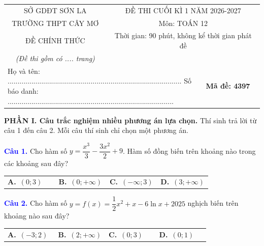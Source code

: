 \documentclass[12pt,a4paper]{article}
\begin{document}
\begin{center}
\begin{tabular}{|p{0.4\linewidth}|p{0.35\linewidth}|p{0.25\linewidth}|}
\hline
\multicolumn{1}{|c|}{SỞ GDĐT SƠN LA} & \multicolumn{2}{c|}{ĐỀ THI CUỐI KÌ 1 NĂM 2026-2027} \\
\multicolumn{1}{|c|}{TRƯỜNG THPT CÂY MƠ} & \multicolumn{2}{c|}{Môn: TOÁN 12} \\
\multicolumn{1}{|c|}{ĐỀ CHÍNH THỨC} & \multicolumn{2}{c|}{Thời gian: 90 phút, không kể thời gian phát đề} \\
\multicolumn{1}{|c|}{\textit{(Đề thi gồm có .... trang)}} & \multicolumn{2}{c|}{} \\
\hline
\multicolumn{2}{|p{0.75\linewidth}|}{Họ và tên: ........................................................................................ \newline Số báo danh: ....................................................................................} & \multicolumn{1}{c|}{\textbf{Mã đề: 4397}} \\
\hline
\end{tabular}
\end{center}

\bigskip

\noindent\textbf{PHẦN I. Câu trắc nghiệm nhiều phương án lựa chọn.}
Thí sinh trả lời từ câu 1 đến câu 2. Mỗi câu thí sinh chỉ chọn một phương án.

\medskip

\noindent\textcolor{blue}{\textbf{Câu 1.}} Cho hàm số $y=\dfrac{x^{3}}{3} - \dfrac{3 x^{2}}{2} + 9$. Hàm số đồng biến trên khoảng nào trong các khoảng sau đây?

\noindent\begin{tabular}{p{0.25\linewidth} p{0.25\linewidth} p{0.25\linewidth} p{0.25\linewidth}}
\textbf{A.}~$(0;3)$ & \textbf{B.}~$(0;+\infty)$ & \textbf{C.}~$(-\infty;3)$ & \textbf{D.}~$(3;+\infty)$ \\
\end{tabular}

\noindent\textcolor{blue}{\textbf{Câu 2.}} Cho hàm số $y=f(x)=\dfrac{1}{2} x^2+x-6\ln x+2025$ nghịch biến trên khoảng nào sau đây?

\noindent\begin{tabular}{p{0.25\linewidth} p{0.25\linewidth} p{0.25\linewidth} p{0.25\linewidth}}
\textbf{A.}~$(-3;2)$ & \textbf{B.}~$(2;+\infty)$ & \textbf{C.}~$(0;3)$ & \textbf{D.}~$(0;1)$ \\
\end{tabular}
\end{document}
